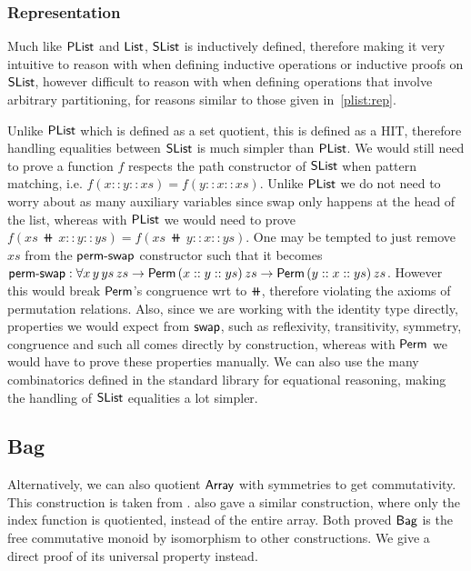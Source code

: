 \subsubsection{Representation}\label{slist:rep}
Much like $\operatorname{\mathsf{PList}}$ and $\operatorname{\mathsf{List}}$, $\operatorname{\mathsf{SList}}$ is inductively defined, therefore making it very intuitive to reason
with when defining inductive operations or inductive proofs on $\operatorname{\mathsf{SList}}$, however difficult to reason with
when defining operations that involve arbitrary partitioning, for reasons similar to those given
in~\ref{plist:rep}.

Unlike $\operatorname{\mathsf{PList}}$ which is defined as a set quotient, this is defined as a HIT, therefore handling equalities
between $\operatorname{\mathsf{SList}}$ is much simpler than $\operatorname{\mathsf{PList}}$. We would still need to prove a function $f$ respects
the path constructor of $\operatorname{\mathsf{SList}}$ when pattern matching, i.e. $f(x :: y :: xs) = f(y :: x :: xs)$.
Unlike $\operatorname{\mathsf{PList}}$ we do not need to worry about as many auxiliary variables since swap
only happens at the head of the list, whereas with $\operatorname{\mathsf{PList}}$ we would need to prove
$f(xs\,\doubleplus\,x :: y :: ys) = f(xs\,\doubleplus\,y :: x :: ys)$. One may be tempted to just remove $xs$
from the $\operatorname{\mathsf{perm-swap}}$ constructor such that it becomes
$\operatorname{\mathsf{perm-swap}} : \forall x\,y\,ys\,zs \to \operatorname{\mathsf{Perm}}\,(x :: y :: ys)\,zs \to \operatorname{\mathsf{Perm}}\,(y :: x :: ys)\,zs$.
However this would break $\operatorname{\mathsf{Perm}}$'s congruence wrt to $\doubleplus$, therefore violating the axioms of
permutation relations. Also, since we are working with the identity type directly, properties we would
expect from $\operatorname{\mathsf{swap}}$, such as reflexivity, transitivity, symmetry, congruence and such all comes directly by
construction, whereas with $\operatorname{\mathsf{Perm}}$ we would have to prove these properties manually.
We can also use the many combinatorics defined in the standard library for equational reasoning,
making the handling of $\operatorname{\mathsf{SList}}$ equalities a lot simpler.

\subsection{Bag}\label{cmon:bag}
Alternatively, we can also quotient $\operatorname{\mathsf{Array}}$ with symmetries to get commutativity.
This construction is taken from \cite{choudhuryFreeCommutativeMonoids2023}. \cite{joramConstructiveFinalSemantics2023}
also gave a similar construction, where only the index function is quotiented, instead of
the entire array. Both proved $\operatorname{\mathsf{Bag}}$ is the free commutative monoid by isomorphism to
other constructions. We give a direct proof of its universal property instead.

